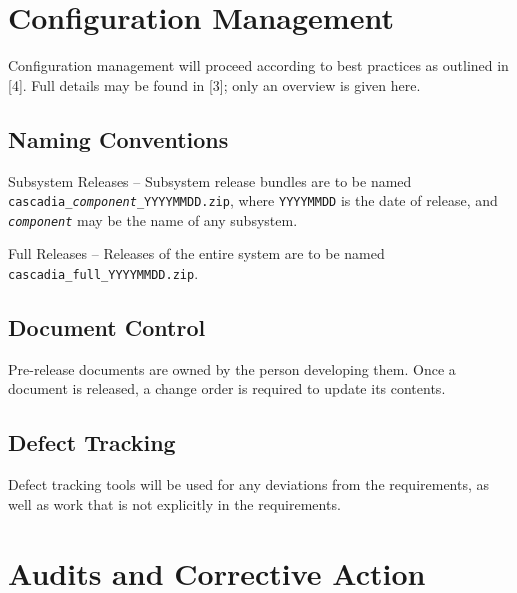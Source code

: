 \documentclass[11pt]{wacomepd}
\begin{document}
\chapter{Configuration Management}

Configuration management will proceed according to best practices as outlined in [4].  Full details
may be found in [3]; only an overview is given here.

\section{Naming Conventions}
{\sc Subsystem Releases} -- Subsystem release bundles are to be named
{\tt cascadia\_\textit{component}\_YYYYMMDD.zip}, where {\tt YYYYMMDD} is the date of release,
and {\tt \textit{component}} may be the name of any subsystem.

{\sc Full Releases} -- Releases of the entire system are to be named
\texttt{cascadia\_full\_YYYYMMDD.zip}.


\section{Document Control}
Pre-release documents are owned by the person developing them.  Once a document is released, a
change order is required to update its contents.


\section{Defect Tracking}
Defect tracking tools will be used for any deviations from the requirements, as well as work that is
not explicitly in the requirements.


\chapter{Audits and Corrective Action}
\end{document}
